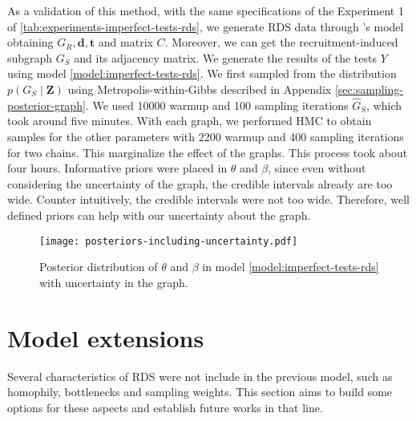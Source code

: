 As a validation of this method, with the same specifications of the Experiment
1 of \autoref{tab:experiments-imperfect-tests-rds}, we generate RDS data
through \textcite{crawford2016}'s model obtaining $G_R, \boldsymbol{d},
\boldsymbol{t}$ and matrix $C$. Moreover, we can get the recruitment-induced
subgraph $G_S$ and its adjacency matrix. We generate the results of the tests
$Y$ using model \eqref{model:imperfect-tests-rds}. We first sampled from the
distribution $p(G_S \mid \boldsymbol{Z})$ using Metropolis-within-Gibbs
described in Appendix \ref{sec:sampling-posterior-graph}. We used 10000 warmup
and 100 sampling iterations $\hat{G}_S$, which took around five minutes. With each
graph, we performed HMC to obtain samples for the other parameters with 2200
warmup and 400 sampling iterations for two chains. This marginalize the
effect of the graphs. This process took about four hours. Informative priors
were placed in $\theta$ and $\beta$, since even without considering the
uncertainty of the graph, the credible intervals already are too wide. Counter
intuitively, the credible intervals were not too wide. Therefore, well defined
priors can help with our uncertainty about the graph. 

\begin{figure}[htbp]
  \centering
  \caption{\label{fig:posteriors-including-uncertainty}Posterior distribution
  of $\theta$ and $\beta$ in model \eqref{model:imperfect-tests-rds} with
  uncertainty in the graph.}
  \texttt{[image: posteriors-including-uncertainty.pdf]}
\end{figure}

\section{Model extensions}
\label{sec:model_extensions}

Several characteristics of RDS were not include in the previous model, such as
homophily, bottlenecks and sampling weights. This section aims to build some
options for these aspects and establish future works in that line.

